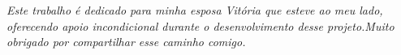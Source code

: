 \begin{dedicatoria}
   \vspace*{\fill}
   \centering
   \noindent
   \textit{ Este trabalho é dedicado para minha esposa Vitória que esteve ao meu lado, oferecendo apoio incondicional durante o desenvolvimento desse projeto.Muito obrigado por compartilhar esse caminho comigo.  } \vspace*{\fill}
\end{dedicatoria}